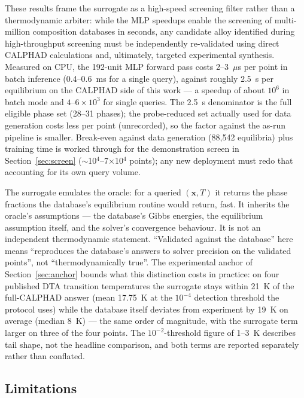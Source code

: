 \documentclass[preprint,12pt,authoryear]{elsarticle}
\begin{document}
These results frame the surrogate as a high-speed screening filter rather
than a thermodynamic arbiter: while the MLP speedups enable the screening
of multi-million composition databases in seconds, any candidate alloy
identified during high-throughput screening \citep{mayr2009screening} must be independently
re-validated using direct CALPHAD calculations and, ultimately, targeted
experimental synthesis. Measured on CPU, the 192-unit MLP forward pass
costs 2--3~$\mu$s per point in batch inference (0.4--0.6~ms for a single
query), against roughly 2.5~s per equilibrium on the CALPHAD side of this
work --- a speedup of about $10^{6}$ in batch mode and
$4$--$6\times10^{3}$ for single queries. The 2.5~s denominator is the full
eligible phase set (28--31 phases); the probe-reduced set actually used for
data generation costs less per point (unrecorded), so the factor against
the as-run pipeline is smaller. Break-even against data generation
(88{,}542 equilibria) plus training time is worked through for the
demonstration screen in Section~\ref{sec:screen}
($\sim$10$^4$--7$\times$10$^4$ points); any new deployment must redo that
accounting for its own query volume.

The surrogate emulates the oracle: for a queried $(\mathbf{x}, T)$ it returns
the phase fractions the database's equilibrium routine would return, fast.
It inherits the oracle's assumptions --- the database's Gibbs energies, the
equilibrium assumption itself, and the solver's convergence behaviour. It is
not an independent thermodynamic statement. ``Validated against the database''
here means ``reproduces the database's answers to solver precision on the
validated points'', not ``thermodynamically true''. The experimental anchor
of Section~\ref{sec:anchor} bounds what this distinction costs in
practice: on four published DTA transition temperatures the surrogate
stays within 21~K of the full-CALPHAD answer (mean 17.75~K at the
$10^{-4}$ detection threshold the protocol uses) while the database
itself deviates from experiment by 19~K on average (median 8~K) --- the
same order of magnitude, with the surrogate term larger on three of the
four points. The $10^{-2}$-threshold figure of 1--3~K describes tail shape,
not the headline comparison, and both terms are reported separately rather
than conflated.

\subsection{Limitations}
\end{document}
